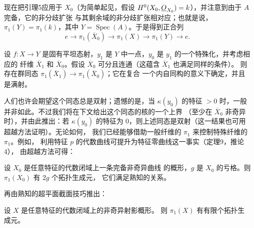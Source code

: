 现在把引理5应用于 $X_0$（为简单起见，假设
$H^0(X_0,\underline{O}_{X_0})=k$），并注意到由于 $A$ 完备，它的非分歧扩张
与其剩余域的非分歧扩张相对应；也就是说，
$\pi_1(Y)=\pi_1(k)$，其中 $Y=\operatorname{Spec}(A)$。于是得到正合列
\[
  e\longrightarrow\pi_1(\overline X_0)
  \longrightarrow\pi_1(X)\longrightarrow\pi_1(Y)\longrightarrow e.
\]

 设 $f:X\longrightarrow Y$ 是固有平坦态射，$y_1$
是 $Y$ 中一点，$y_0$ 是 $y_1$ 的一个特殊化，并考虑相应的
纤维 $\overline X_1$ 和 $\overline X_0$。假设
$\overline X_0$ 可分且连通（这蕴含 $\overline X_1$ 也满足同样的条件）。
则存在群同态
$\pi_1(\overline X_1)\longrightarrow\pi_1(\overline X_0)$；它在复合
一个内自同构的意义下确定，并且是满射。

人们也许会期望这个同态总是双射；遗憾的是，当 $\kappa(y_0)$ 的特征
$>0$ 时，一般并非如此。不过我们将在下文给出这个同态的核的一个上界
（至少在 $\overline X_0$ 非奇异时），并由此推出：若 $\kappa(y_0)$
的特征为 $0$，则上述同态是双射（这一结果也可用超越方法证明）。无论如何，
我们已经能够借助一般纤维的 $\pi_1$ 来控制特殊纤维的 $\pi_1$。例如，
利用特征 $p$ 的代数曲线可提升为特征零曲线这一事实（定理9，推论4），
由超越方法可得：

 设 $X_0$ 是任意特征的代数闭域上一条完备非奇异曲线
的概形，$g$ 是 $X_0$ 的亏格。则 $\pi_1(X_0)$ 有 $2g$ 个拓扑生成元，
它们满足熟知的关系。

再由熟知的超平面截面技巧推出：

 设 $X$ 是任意特征的代数闭域上的非奇异射影概形。
则 $\pi_1(X)$ 有有限个拓扑生成元。

